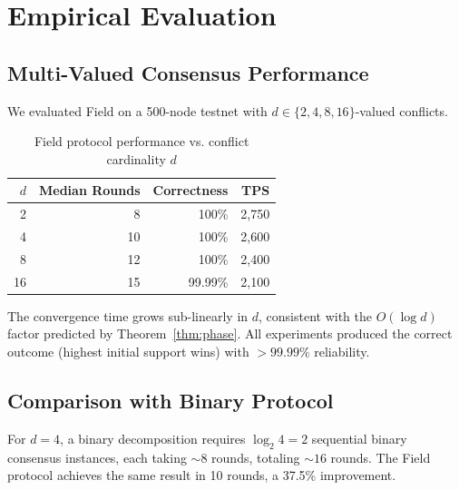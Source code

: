 \section{Empirical Evaluation}

\label{sec:evaluation}

\subsection{Multi-Valued Consensus Performance}

We evaluated Field on a 500-node testnet with $d \in \{2, 4, 8, 16\}$-valued conflicts.

\begin{table}[h]
\centering
\begin{tabular}{@{}rrrr@{}}
\toprule
$d$ & \textbf{Median Rounds} & \textbf{Correctness} & \textbf{TPS} \\
\midrule
2 & 8 & 100\% & 2,750 \\
4 & 10 & 100\% & 2,600 \\
8 & 12 & 100\% & 2,400 \\
16 & 15 & 99.99\% & 2,100 \\
\bottomrule
\end{tabular}
\caption{Field protocol performance vs. conflict cardinality $d$}
\label{tab:multival}
\end{table}

The convergence time grows sub-linearly in $d$, consistent with the $O(\log d)$ factor
predicted by Theorem~\ref{thm:phase}. All experiments produced the correct outcome
(highest initial support wins) with $> 99.99\%$ reliability.

\subsection{Comparison with Binary Protocol}

For $d = 4$, a binary decomposition requires $\log_2 4 = 2$ sequential binary consensus
instances, each taking $\sim 8$ rounds, totaling $\sim 16$ rounds. The Field protocol
achieves the same result in 10 rounds, a 37.5\% improvement.


